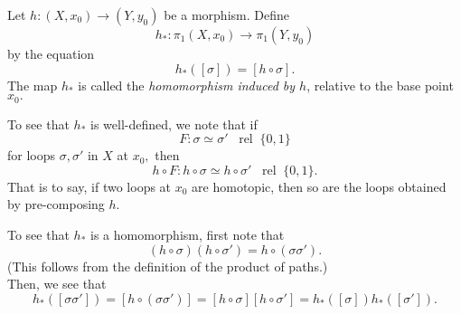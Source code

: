 \documentclass[12pt]{article}
\newcommand{\rel}{\;\;\operatorname{rel}\;}
\begin{document}
\begin{defn}
	Let $h:(X, x_0) \to (Y, y_0)$ be a morphism. Define
	\begin{equation*} 
		h_* : \pi_1(X, x_0) \to \pi_1(Y, y_0)
	\end{equation*}
	by the equation
	\begin{equation*} 
		h_*([\sigma]) = [h\circ \sigma].
	\end{equation*}
	The map $h_*$ is called the \emph{homomorphism induced by $h$}, relative to the base point $x_0.$
\end{defn}
To see that $h_*$ is well-defined, we note that if 
\begin{equation*} 
	F : \sigma \simeq \sigma' \rel \{0, 1\}
\end{equation*}
for loops $\sigma, \sigma'$ in $X$ at $x_0,$ then
\begin{equation*} 
	h \circ F : h\circ \sigma \simeq h\circ\sigma' \rel \{0, 1\}.
\end{equation*}
That is to say, if two loops at $x_0$ are homotopic, then so are the loops obtained by pre-composing $h.$

To see that $h_*$ is a homomorphism, first note that
\begin{equation*} 
	(h \circ \sigma)(h \circ \sigma') = h\circ(\sigma\sigma').
\end{equation*}
(This follows from the definition of the product of paths.)\\
Then, we see that
\begin{equation*} 
	h_*([\sigma\sigma']) = [h\circ(\sigma\sigma')] = [h\circ\sigma][h\circ\sigma'] = h_*([\sigma])h_*([\sigma']).
\end{equation*}
\end{document}
